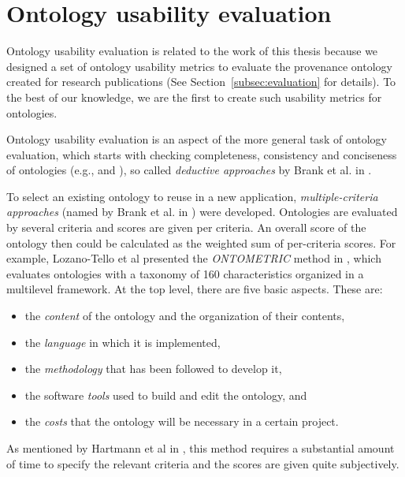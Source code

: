 
\section{Ontology usability evaluation}
Ontology usability evaluation is related to the work of this thesis because we designed a set of ontology usability metrics to evaluate the provenance ontology created for research publications (See Section~\ref{subsec:evaluation} for details). To the best of our knowledge, we are the first to create such usability metrics for ontologies.

Ontology usability evaluation is an aspect of the more general task of ontology evaluation, which starts with checking completeness, consistency and conciseness of ontologies (e.g., \cite{gruninger1995methodology} and \cite{gomez2001evaluation}), so called \emph{deductive approaches} by Brank et al. in \cite{brank2005survey}.

To select an existing ontology to reuse in a new application, \emph{multiple-criteria approaches} (named by Brank et al. in \cite{brank2005survey}) were developed. Ontologies are evaluated by several criteria and scores are given per criteria. An overall score of the ontology then could be calculated as the weighted sum of per-criteria scores. For example, Lozano-Tello et al presented the \emph{ONTOMETRIC} method in \cite{lozano2003selection,lozano2004ontometric}, which evaluates ontologies with a taxonomy of
160 characteristics organized in a multilevel framework. At the top level, there are five basic aspects. These are: 
\begin{itemize}
	\item the \emph{content} of the ontology and the
	organization of their contents,
	\item the \emph{language}
	in which it is implemented, 
	\item the \emph{methodology}
	that has been followed to develop it,
	\item the software \emph{tools} used to build and edit
	the ontology, and 
	\item the \emph{costs} that the ontology
	will be necessary in a certain project.
\end{itemize} 
As mentioned by Hartmann et al in \cite{hartmann2005d1}, this method requires a substantial amount of time to specify the relevant criteria and the scores are given quite subjectively.


